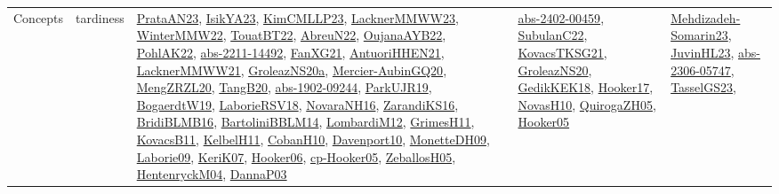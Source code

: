 {\begin{longtable}{lp{3cm}>{\raggedright}p{6cm}>{\raggedright}p{6cm}p{8cm}}
Concepts & tardiness & \href{articles/PrataAN23.pdf}{PrataAN23}\cite{PrataAN23}, \href{articles/IsikYA23.pdf}{IsikYA23}\cite{IsikYA23}, \href{papers/KimCMLLP23.pdf}{KimCMLLP23}\cite{KimCMLLP23}, \href{articles/LacknerMMWW23.pdf}{LacknerMMWW23}\cite{LacknerMMWW23}, \href{papers/WinterMMW22.pdf}{WinterMMW22}\cite{WinterMMW22}, \href{papers/TouatBT22.pdf}{TouatBT22}\cite{TouatBT22}, \href{articles/AbreuN22.pdf}{AbreuN22}\cite{AbreuN22}, \href{papers/OujanaAYB22.pdf}{OujanaAYB22}\cite{OujanaAYB22}, \href{articles/PohlAK22.pdf}{PohlAK22}\cite{PohlAK22}, \href{articles/abs-2211-14492.pdf}{abs-2211-14492}\cite{abs-2211-14492}, \href{articles/FanXG21.pdf}{FanXG21}\cite{FanXG21}, \href{papers/AntuoriHHEN21.pdf}{AntuoriHHEN21}\cite{AntuoriHHEN21}, \href{papers/LacknerMMWW21.pdf}{LacknerMMWW21}\cite{LacknerMMWW21}, \href{papers/GroleazNS20a.pdf}{GroleazNS20a}\cite{GroleazNS20a}, \href{papers/Mercier-AubinGQ20.pdf}{Mercier-AubinGQ20}\cite{Mercier-AubinGQ20}, \href{articles/MengZRZL20.pdf}{MengZRZL20}\cite{MengZRZL20}, \href{papers/TangB20.pdf}{TangB20}\cite{TangB20}, \href{articles/abs-1902-09244.pdf}{abs-1902-09244}\cite{abs-1902-09244}, \href{papers/ParkUJR19.pdf}{ParkUJR19}\cite{ParkUJR19}, \href{papers/BogaerdtW19.pdf}{BogaerdtW19}\cite{BogaerdtW19}, \href{articles/LaborieRSV18.pdf}{LaborieRSV18}\cite{LaborieRSV18}, \href{articles/NovaraNH16.pdf}{NovaraNH16}\cite{NovaraNH16}, \href{articles/ZarandiKS16.pdf}{ZarandiKS16}\cite{ZarandiKS16}, \href{articles/BridiBLMB16.pdf}{BridiBLMB16}\cite{BridiBLMB16}, \href{papers/BartoliniBBLM14.pdf}{BartoliniBBLM14}\cite{BartoliniBBLM14}, \href{articles/LombardiM12.pdf}{LombardiM12}\cite{LombardiM12}, \href{papers/GrimesH11.pdf}{GrimesH11}\cite{GrimesH11}, \href{articles/KovacsB11.pdf}{KovacsB11}\cite{KovacsB11}, \href{articles/KelbelH11.pdf}{KelbelH11}\cite{KelbelH11}, \href{papers/CobanH10.pdf}{CobanH10}\cite{CobanH10}, \href{papers/Davenport10.pdf}{Davenport10}\cite{Davenport10}, \href{papers/MonetteDH09.pdf}{MonetteDH09}\cite{MonetteDH09}, \href{papers/Laborie09.pdf}{Laborie09}\cite{Laborie09}, \href{papers/KeriK07.pdf}{KeriK07}\cite{KeriK07}, \href{articles/Hooker06.pdf}{Hooker06}\cite{Hooker06}, \href{papers/cp-Hooker05.pdf}{cp-Hooker05}\cite{cp-Hooker05}, \href{articles/ZeballosH05.pdf}{ZeballosH05}\cite{ZeballosH05}, \href{papers/HentenryckM04.pdf}{HentenryckM04}\cite{HentenryckM04}, \href{papers/DannaP03.pdf}{DannaP03}\cite{DannaP03} & \href{articles/abs-2402-00459.pdf}{abs-2402-00459}\cite{abs-2402-00459}, \href{articles/SubulanC22.pdf}{SubulanC22}\cite{SubulanC22}, \href{papers/KovacsTKSG21.pdf}{KovacsTKSG21}\cite{KovacsTKSG21}, \href{papers/GroleazNS20.pdf}{GroleazNS20}\cite{GroleazNS20}, \href{articles/GedikKEK18.pdf}{GedikKEK18}\cite{GedikKEK18}, \href{papers/Hooker17.pdf}{Hooker17}\cite{Hooker17}, \href{articles/NovasH10.pdf}{NovasH10}\cite{NovasH10}, \href{papers/QuirogaZH05.pdf}{QuirogaZH05}\cite{QuirogaZH05}, \href{articles/Hooker05.pdf}{Hooker05}\cite{Hooker05} & \href{papers/Mehdizadeh-Somarin23.pdf}{Mehdizadeh-Somarin23}\cite{Mehdizadeh-Somarin23}, \href{papers/JuvinHL23.pdf}{JuvinHL23}\cite{JuvinHL23}, \href{articles/abs-2306-05747.pdf}{abs-2306-05747}\cite{abs-2306-05747}, \href{papers/TasselGS23.pdf}{TasselGS23}\cite{TasselGS23}, 
\end{longtable}}
